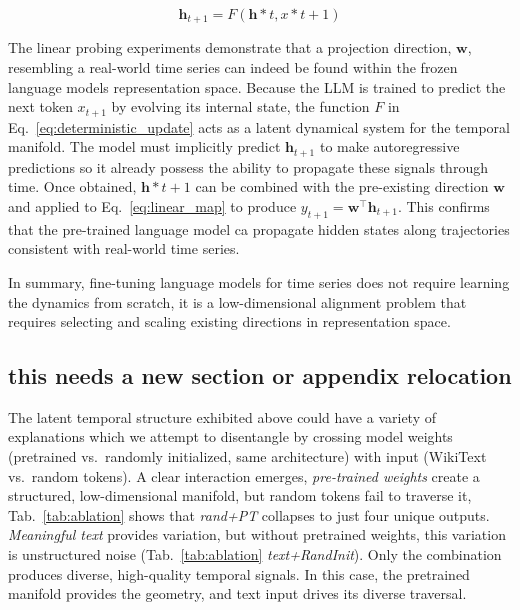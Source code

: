 \begin{equation}
\label{eq:deterministic_update}
    \mathbf{h}_{t+1} = F(\mathbf{h}*t, x*{t+1})
\end{equation}

The linear probing experiments demonstrate that a projection direction, $\mathbf{w}$, resembling a real-world time series can indeed be found within the frozen language models representation space. Because the LLM is trained to predict the next token $x_{t+1}$ by evolving its internal state, the function $F$ in Eq.~\ref{eq:deterministic_update} acts as a latent dynamical system for the temporal manifold. The model must implicitly predict $\mathbf{h}_{t+1}$ to make autoregressive predictions so it already possess the ability to propagate these signals through time. Once obtained, $\mathbf{h}*{t+1}$ can be combined with the pre-existing direction $\mathbf{w}$ and applied to Eq.~\ref{eq:linear_map} to produce $y_{t+1} = \mathbf{w}^\top \mathbf{h}_{t+1}$. This confirms that the pre-trained language model ca propagate hidden states along trajectories consistent with real-world time series.

In summary, fine-tuning language models for time series does not require learning the dynamics from scratch, it is a low-dimensional alignment problem that requires selecting and scaling existing directions in representation space.

\subsection{this needs a new section or appendix relocation}
The latent temporal structure exhibited above could have a variety of explanations which we attempt to 
disentangle by crossing model weights (pretrained vs.\ randomly initialized, same architecture) with input (WikiText vs.\ random tokens). A clear interaction emerges, \textit{pre-trained weights} create a structured, low-dimensional manifold, but random tokens fail to traverse it, Tab.~\ref{tab:ablation} shows that \textit{rand+PT} collapses to just four unique outputs. \textit{Meaningful text} provides variation, but without pretrained weights, this variation is unstructured noise (Tab.~\ref{tab:ablation} \textit{text+RandInit}). Only the combination produces diverse, high-quality temporal signals. In this case, the pretrained manifold provides the geometry, and text input drives its diverse traversal.

